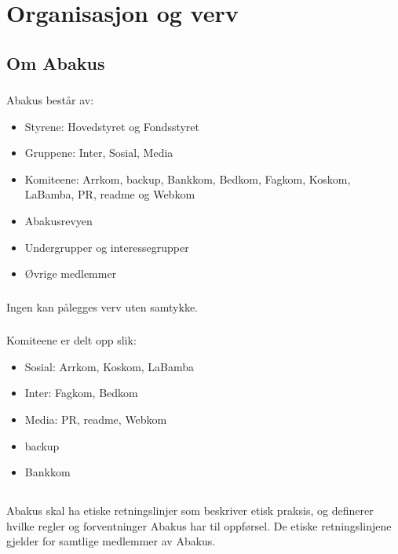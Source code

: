 \section{Organisasjon og verv}
\subsection{Om Abakus}

\subsubsection{}
Abakus består av:

\begin{itemize}
\item Styrene: Hovedstyret og Fondsstyret
\item Gruppene: Inter, Sosial, Media
\item Komiteene: Arrkom, backup, Bankkom, Bedkom, Fagkom, Koskom, LaBamba, PR, readme og Webkom
\item Abakusrevyen
\item Undergrupper og interessegrupper
\item Øvrige medlemmer
\end{itemize}

\subsubsection{}
Ingen kan pålegges verv uten samtykke.

\subsubsection{}
Komiteene er delt opp slik:

\begin{itemize}
\item Sosial: Arrkom, Koskom, LaBamba
\item Inter: Fagkom, Bedkom
\item Media: PR, readme, Webkom
\item backup
\item Bankkom
\end{itemize}

\subsection{}
Abakus skal ha etiske retningslinjer som beskriver etisk praksis, og definerer hvilke regler og
forventninger Abakus har til oppførsel. De etiske retningslinjene gjelder for samtlige medlemmer av
Abakus.

